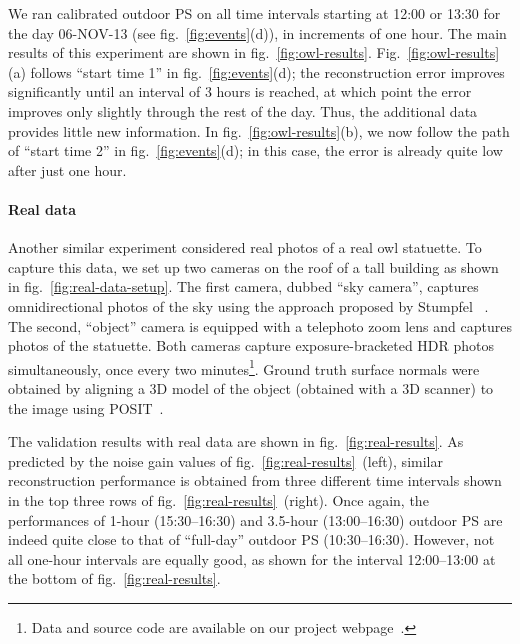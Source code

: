 
We ran calibrated outdoor PS on all time intervals starting at 12:00 or 13:30 for the day 06-NOV-13 (see fig.~\ref{fig:events}(d)), in increments of one hour. The main results of this experiment are shown in fig.~\ref{fig:owl-results}. Fig.~\ref{fig:owl-results}(a) follows ``start time 1'' in fig.~\ref{fig:events}(d); the reconstruction error improves significantly until an interval of 3 hours is reached, at which point the error improves only slightly through the rest of the day. Thus, the additional data provides little new information. In fig.~\ref{fig:owl-results}(b), we now follow the path of ``start time 2'' in fig.~\ref{fig:events}(d); in this case, the error is already quite low after just one hour.
%
\vspace{-3mm}
\paragraph{Real data}%
%
Another similar experiment considered real photos of a real owl statuette. To capture this data, we set up two cameras on the roof of a tall building as shown in fig.~\ref{fig:real-data-setup}. The first camera, dubbed ``sky camera'', captures omnidirectional photos of the sky using the approach proposed by Stumpfel \etal~\cite{stumpfel-afrigraph-04}. The second, ``object'' camera is equipped with a telephoto zoom lens and captures photos of the statuette. Both cameras capture exposure-bracketed HDR photos simultaneously, once every two minutes\footnote{Data and source code are available on our project webpage~\cite{webpageXhourPS}.}. Ground truth surface normals were obtained by aligning a 3D model of the object (obtained with a 3D scanner) to the image using POSIT~\cite{dementhon-ijcv-95}. 

The validation results with real data are shown in fig.~\ref{fig:real-results}. As predicted by the noise gain values of fig.~\ref{fig:real-results}~(left), similar reconstruction performance is obtained from three different time intervals shown in the top three rows of fig.~\ref{fig:real-results}~(right). Once again, the performances of 1-hour (15:30--16:30) and 3.5-hour (13:00--16:30) outdoor PS are indeed quite close to that of ``full-day'' outdoor PS (10:30--16:30). However, not all one-hour intervals are equally good, as shown for the interval 12:00--13:00 at the bottom of fig.~\ref{fig:real-results}.


